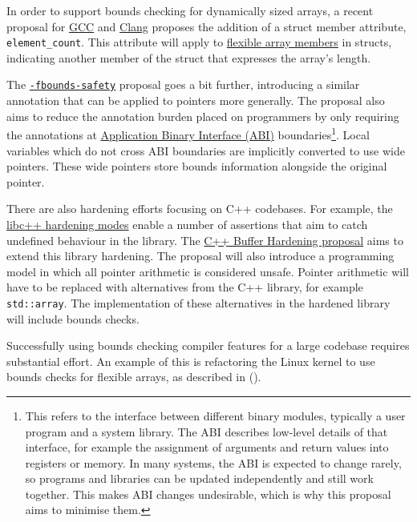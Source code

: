 \documentclass[
  a4paper,
]{report}
\begin{document}
In order to support bounds checking for dynamically sized arrays, a
recent proposal for
\href{https://gcc.gnu.org/bugzilla/show_bug.cgi?id=108896}{GCC} and
\href{https://reviews.llvm.org/D148381}{Clang} proposes the addition of
a struct member attribute, \texttt{element\_count}. This attribute will
apply to
\href{https://en.wikipedia.org/wiki/Flexible_array_member}{flexible
array members} in structs, indicating another member of the struct that
expresses the array's length.

The
\href{https://discourse.llvm.org/t/rfc-enforcing-bounds-safety-in-c-fbounds-safety/70854}{\texttt{-fbounds-safety}}
proposal goes a bit further, introducing a similar annotation that can
be applied to pointers more generally. The proposal also aims to reduce
the annotation burden placed on programmers by only requiring the
annotations at
\href{https://en.wikipedia.org/wiki/Application_binary_interface}{\label{__index_entry_87}{Application
Binary Interface (ABI)}}
boundaries\footnote{This refers to the interface between different
  binary modules, typically a user program and a system library. The ABI
  describes low-level details of that interface, for example the
  assignment of arguments and return values into registers or memory. In
  many systems, the ABI is expected to change rarely, so programs and
  libraries can be updated independently and still work together. This
  makes ABI changes undesirable, which is why this proposal aims to
  minimise them.}. Local variables which do not cross ABI boundaries are
implicitly converted to use wide pointers. These wide pointers store
bounds information alongside the original pointer.

There are also hardening efforts focusing on C++ codebases. For example,
the \href{https://libcxx.llvm.org/Hardening.html}{libc++ hardening
modes} enable a number of assertions that aim to catch undefined
behaviour in the library. The
\href{https://discourse.llvm.org/t/rfc-c-buffer-hardening/65734}{C++
Buffer Hardening proposal} aims to extend this library hardening. The
proposal will also introduce a programming model in which all pointer
arithmetic is considered unsafe. Pointer arithmetic will have to be
replaced with alternatives from the C++ library, for example
\texttt{std::array}. The implementation of these alternatives in the
hardened library will include bounds checks.

Successfully using bounds checking compiler features for a large
codebase requires substantial effort. An example of this is refactoring
the Linux kernel to use bounds checks for flexible arrays, as described
in ().
\end{document}
